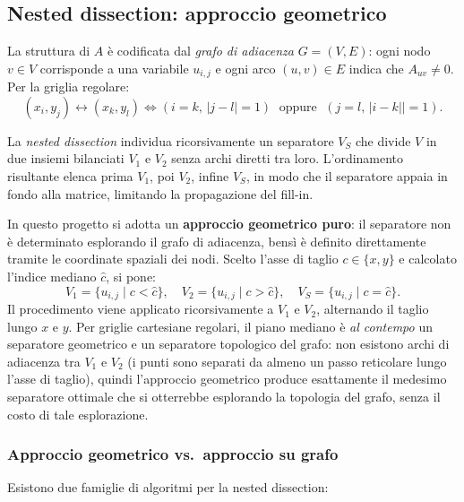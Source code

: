 \documentclass[a4paper,12pt]{article}
\begin{document}
\subsection*{Nested dissection: approccio geometrico}

La struttura di $A$ è codificata dal \emph{grafo di adiacenza} $G = (V, E)$: ogni nodo $v \in V$ corrisponde a una variabile $u_{i,j}$ e ogni arco $(u,v) \in E$ indica che $A_{uv} \neq 0$. Per la griglia regolare:
\[
  (x_i, y_j) \leftrightarrow (x_k, y_l) \iff (i=k,\, |j-l|=1) \;\text{ oppure }\; (j=l,\, |i-k||=1).
\]

La \emph{nested dissection} individua ricorsivamente un separatore $V_S$ che divide $V$ in due insiemi bilanciati $V_1$ e $V_2$ senza archi diretti tra loro. L'ordinamento risultante elenca prima $V_1$, poi $V_2$, infine $V_S$, in modo che il separatore appaia in fondo alla matrice, limitando la propagazione del fill-in.

In questo progetto si adotta un \textbf{approccio geometrico puro}: il separatore non è determinato esplorando il grafo di adiacenza, bensì è definito direttamente tramite le coordinate spaziali dei nodi. Scelto l'asse di taglio $c \in \{x, y\}$ e calcolato l'indice mediano $\hat{c}$, si pone:
\[
  V_1 = \{u_{i,j}\mid c < \hat{c}\},\quad
  V_2 = \{u_{i,j}\mid c > \hat{c}\},\quad
  V_S = \{u_{i,j}\mid c = \hat{c}\}.
\]
Il procedimento viene applicato ricorsivamente a $V_1$ e $V_2$, alternando il taglio lungo $x$ e $y$. Per griglie cartesiane regolari, il piano mediano è \emph{al contempo} un separatore geometrico e un separatore topologico del grafo: non esistono archi di adiacenza tra $V_1$ e $V_2$ (i punti sono separati da almeno un passo reticolare lungo l'asse di taglio), quindi l'approccio geometrico produce esattamente il medesimo separatore ottimale che si otterrebbe esplorando la topologia del grafo, senza il costo di tale esplorazione.

\subsubsection*{Approccio geometrico vs.\ approccio su grafo}

Esistono due famiglie di algoritmi per la nested dissection:
\end{document}
